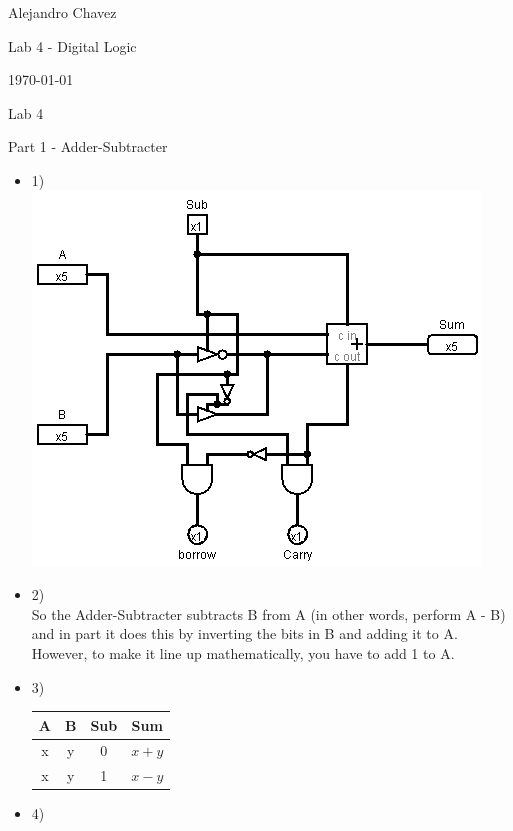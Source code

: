 \documentclass{article}
\begin{document}
\hfill Alejandro Chavez

\hfill Lab 4 - Digital Logic

\hfill \today\\

\begin{center}\begin{large}Lab 4\end{large}\end{center}	Part 1 - Adder-Subtracter
\begin{itemize}
	\item
		1)\\
	  \includegraphics[scale=0.5]{lab4-part1-1.png}
  \item
		2)\\
		So the Adder-Subtracter subtracts B from A (in other words, perform A - B) and in part it does this by inverting the bits in B and adding it to A. However, to make it line up mathematically, you have to add 1 to A.
	\item
		3)\\
    \begin{tabular}{|cc|c||c|} \hline
    A & B & Sub & Sum\\ \hline
    x & y & 0   & $x+y$\\
    x & y & 1   & $x-y$\\ \hline
    \end{tabular}
  \item
		4)\\

\end{itemize}
\end{document}
